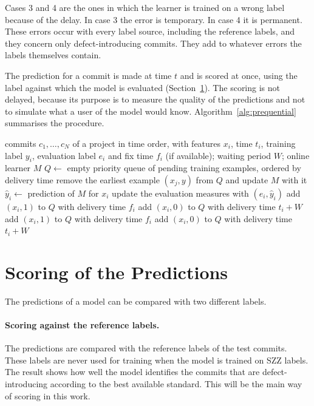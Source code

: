 \documentclass[12pt,a4paper,oneside]{report}
\begin{document}
Cases 3 and 4 are the ones in which the learner is trained on a wrong label
because of the delay. In case 3 the error is temporary. In case 4 it is
permanent. These errors occur with every label source, including the
reference labels, and they concern only defect-introducing commits. They add
to whatever errors the labels themselves contain.

The prediction for a commit is made at time $t$ and is scored at once, using
the label against which the model is evaluated (Section~\ref{sec:scoring}).
The scoring is not delayed, because its purpose is to measure the quality of
the predictions and not to simulate what a user of the model would know.
Algorithm~\ref{alg:prequential} summarises the procedure.

\begin{algorithm}[htbp]
\caption{Prequential evaluation with verification latency}
\label{alg:prequential}
\begin{algorithmic}[1]
\Require commits $c_1,\dots,c_N$ of a project in time order, with features
$x_i$, time $t_i$, training label $y_i$, evaluation label $e_i$ and fix time
$f_i$ (if available); waiting period $W$; online learner $M$
\State $Q \gets$ empty priority queue of pending training examples, ordered by delivery time
    \State remove the earliest example $(x_j, y)$ from $Q$ and update $M$ with it
  \EndWhile
  \State $\hat{y}_i \gets$ prediction of $M$ for $x_i$
  \State update the evaluation measures with $(e_i, \hat{y}_i)$
      \State add $(x_i, 1)$ to $Q$ with delivery time $f_i$
    \Else
      \State add $(x_i, 0)$ to $Q$ with delivery time $t_i + W$
      \State add $(x_i, 1)$ to $Q$ with delivery time $f_i$
    \EndIf
  \Else
    \State add $(x_i, 0)$ to $Q$ with delivery time $t_i + W$
  \EndIf
\EndFor
\end{algorithmic}
\end{algorithm}

\section{Scoring of the Predictions}\label{sec:scoring}

The predictions of a model can be compared with two different labels.

\paragraph{Scoring against the reference labels.} The predictions are
compared with the reference labels of the test commits. These labels are
never used for training when the model is trained on SZZ labels. The result
shows how well the model identifies the commits that are defect-introducing
according to the best available standard. This will be the main way of
scoring in this work.
\end{document}
